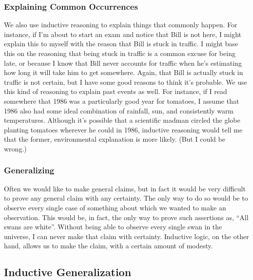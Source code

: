 \subsubsection{Explaining Common Occurrences}

We also use inductive reasoning to explain things
that commonly happen. For instance, if I'm about to
start an exam and notice that Bill is not here, I might
explain this to myself with the reason that Bill is stuck
in traffic. I might base this on the reasoning that being
stuck in traffic is a common excuse for being late, or
because I know that Bill never accounts for traffic
when he's estimating how long it will take him to get
somewhere. Again, that Bill is actually stuck in traffic
is not certain, but I have some good reasons to think
it's probable. We use this kind of reasoning to explain
past events as well. For instance, if I read somewhere
that 1986 was a particularly good year for tomatoes,
I assume that 1986 also had some ideal combination
of rainfall, sun, and consistently warm temperatures.
Although it's possible that a scientific madman circled
the globe planting tomatoes wherever he could in
1986, inductive reasoning would tell me that the
former, environmental explanation is more likely. (But
I could be wrong.)


\subsubsection{Generalizing}

Often we would like to make general claims, but in
fact it would be very difficult to prove any general
claim with any certainty. The only way to do so would
be to observe every single case of something about
which we wanted to make an observation. This would
be, in fact, the only way to prove such assertions as,
``All swans are white''. Without being able to observe
every single swan in the universe, I can never make
that claim with certainty. Inductive logic, on the other
hand, allows us to make the claim, with a certain
amount of modesty.

\subsection{Inductive Generalization}

